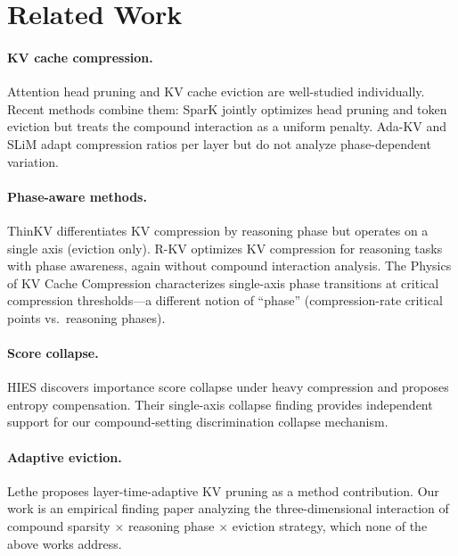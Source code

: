 \documentclass[11pt,a4paper]{article}
\begin{document}
\section{Related Work}

\paragraph{KV cache compression.}
Attention head pruning \cite{voita2019heads,michel2019sixteen} and KV cache eviction \cite{zhang2024h2o,liu2024scissorhands} are well-studied individually. Recent methods combine them: SparK \cite{he2024sparseattn} jointly optimizes head pruning and token eviction but treats the compound interaction as a uniform penalty. Ada-KV \cite{feng2024adakv} and SLiM \cite{tang2024slim} adapt compression ratios per layer but do not analyze phase-dependent variation.

\paragraph{Phase-aware methods.}
ThinKV \cite{xu2025thinkv} differentiates KV compression by reasoning phase but operates on a single axis (eviction only). R-KV \cite{xu2025rkv} optimizes KV compression for reasoning tasks with phase awareness, again without compound interaction analysis. The Physics of KV Cache Compression \cite{devoto2026physics} characterizes single-axis phase transitions at critical compression thresholds---a different notion of ``phase'' (compression-rate critical points vs.\ reasoning phases).

\paragraph{Score collapse.}
HIES \cite{cai2025hies} discovers importance score collapse under heavy compression and proposes entropy compensation. Their single-axis collapse finding provides independent support for our compound-setting discrimination collapse mechanism.

\paragraph{Adaptive eviction.}
Lethe \cite{wu2026lethe} proposes layer-time-adaptive KV pruning as a method contribution. Our work is an empirical finding paper analyzing the three-dimensional interaction of compound sparsity $\times$ reasoning phase $\times$ eviction strategy, which none of the above works address.
\end{document}
